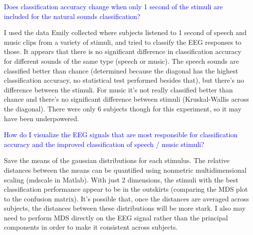 \documentclass[11pt]{article}
\begin{document}
\textcolor{blue}{Does classification accuracy change when only 1 second of the stimuli are included for the natural sounds classification?}

I used the data Emily collected where subjects listened to 1 second of speech and music clips from a variety of stimuli, and tried to classify the EEG responses to those.  It appears that there is no significant difference in classification accuracy for different sounds of the same type (speech or music).  The speech sounds are classified better than chance (determined because the diagonal has the highest classification accuracy, no statistical test performed besides that), but there's no difference between the stimuli.  For music it's not really classified better than chance and there's no significant difference between stimuli (Kruskal-Wallis across the diagonal).  There were only 6 subjects though for this experiment, so it may have been underpowered.

\textcolor{blue}{How do I visualize the EEG signals that are most responsible for classification accuracy and the improved classification of speech / music stimuli?}

Save the means of the gaussian distributions for each stimulus.  The relative distances between the means can be quantified using nonmetric multidimensional scaling (mdscale in Matlab).  With just 2 dimensions, the stimuli with the best classification performance appear to be in the outskirts (comparing the MDS plot to the confusion matrix).  It's possible that, once the distances are averaged across subjects, the distances between these distributions will be more stark.  I also may need to perform MDS directly on the EEG signal rather than the principal components in order to make it consistent across subjects.
\end{document}
